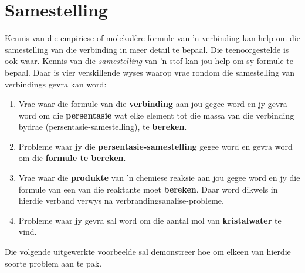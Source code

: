          \section{Samestelling}
    \nopagebreak
      \label{m38712*id280450}Kennis van die empiriese of molekul\^{e}re formule van 'n verbinding kan help om die samestelling van die verbinding in meer detail te bepaal. Die teenoorgestelde is ook waar. Kennis van die \textsl{samestelling} van 'n stof kan jou help om sy formule te bepaal. Daar is vier verskillende wyses waarop vrae rondom die samestelling van verbindings gevra kan word:
      \label{m38712*id280463}\begin{enumerate}[noitemsep, label=\textbf{\arabic*}. ] 
\item Vrae waar die formule van die \textbf{verbinding} aan jou gegee word en jy gevra word om die \textbf{persentasie} wat elke element tot die massa van die verbinding bydrae (persentasie-samestelling), te \textbf{bereken}.
\item Probleme waar jy die \textbf{persentasie-samestelling} gegee word en gevra word om die \textbf{formule te bereken}.
\item Vrae waar die \textbf{produkte} van  'n chemiese reaksie aan jou gegee word en jy die formule van een van die reaktante moet \textbf{bereken}. Daar word dikwels in hierdie verband verwys na verbrandingsanalise-probleme.
\item Probleme waar jy gevra sal word om die aantal mol van \textbf{kristalwater} te vind.
\end{enumerate}
Die volgende uitgewerkte voorbeelde sal demonstreer hoe om  elkeen van hierdie soorte problem aan te pak.
            \label{m38712*secfhsst!!!underscore!!!id901}
      \noindent
{}

